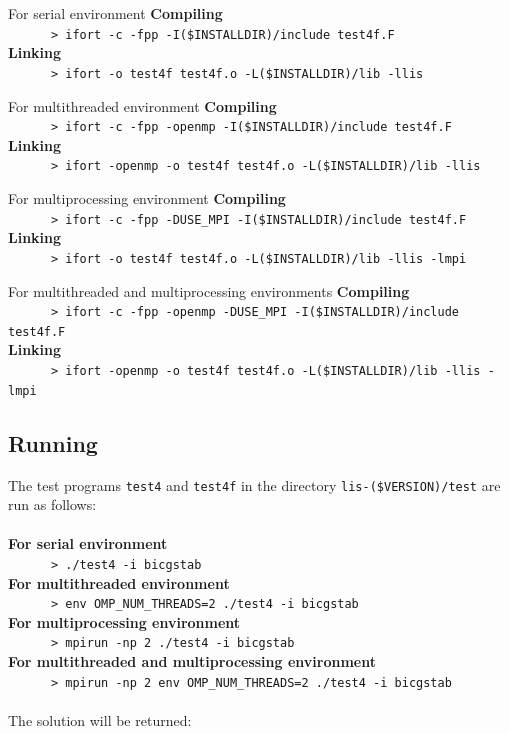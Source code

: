 \documentclass[a4paper]{article}
\begin{document}
\begin{itembox}[l]{For serial environment}
\small
{\bf Compiling}\\
\verb+      > ifort -c -fpp -I($INSTALLDIR)/include test4f.F+\\
{\bf Linking}\\
\verb+      > ifort -o test4f test4f.o -L($INSTALLDIR)/lib -llis+\\
\end{itembox}
\begin{itembox}[l]{For multithreaded environment}
\small
{\bf Compiling}\\
\verb+      > ifort -c -fpp -openmp -I($INSTALLDIR)/include test4f.F+\\
{\bf Linking}\\
\verb+      > ifort -openmp -o test4f test4f.o -L($INSTALLDIR)/lib -llis+\\
\end{itembox}
\begin{itembox}[l]{For multiprocessing environment}
\small
{\bf Compiling}\\
\verb+      > ifort -c -fpp -DUSE_MPI -I($INSTALLDIR)/include test4f.F+\\
{\bf Linking}\\
\verb+      > ifort -o test4f test4f.o -L($INSTALLDIR)/lib -llis -lmpi+\\
\end{itembox}
\begin{itembox}[l]{For multithreaded and multiprocessing environments}
\small
{\bf Compiling}\\
\verb+      > ifort -c -fpp -openmp -DUSE_MPI -I($INSTALLDIR)/include test4f.F+\\
{\bf Linking}\\
\verb+      > ifort -openmp -o test4f test4f.o -L($INSTALLDIR)/lib -llis -lmpi+\\
\end{itembox}

\subsection{Running}
The test programs \verb|test4| and \verb|test4f| 
in the directory \verb|lis-($VERSION)/test| are run as follows: \\\\
{\bf For serial environment}\\
\verb+      > ./test4 -i bicgstab+\\
{\bf For multithreaded environment}\\
\verb+      > env OMP_NUM_THREADS=2 ./test4 -i bicgstab +\\
{\bf For multiprocessing environment}\\
\verb+      > mpirun -np 2 ./test4 -i bicgstab +\\
{\bf For multithreaded and multiprocessing environment}\\
\verb+      > mpirun -np 2 env OMP_NUM_THREADS=2 ./test4 -i bicgstab +\\\\
The solution will be returned:
\end{document}
